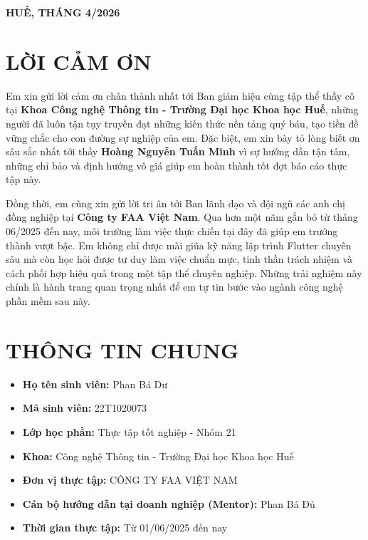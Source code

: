 \documentclass[12pt, a4paper]{article}
\begin{document}
\begin{titlepage}
    \vfill
    \begin{center}
        \textbf{HUẾ, THÁNG 4/2026}
    \end{center}
    \restoregeometry
\end{titlepage}

\newpage

\section*{LỜI CẢM ƠN}
Em xin gửi lời cảm ơn chân thành nhất tới Ban giám hiệu cùng tập thể thầy cô tại \textbf{Khoa Công nghệ Thông tin - Trường Đại học Khoa học Huế}, những người đã luôn tận tụy truyền đạt những kiến thức nền tảng quý báu, tạo tiền đề vững chắc cho con đường sự nghiệp của em. Đặc biệt, em xin bày tỏ lòng biết ơn sâu sắc nhất tới thầy \textbf{Hoàng Nguyễn Tuấn Minh} vì sự hướng dẫn tận tâm, những chỉ bảo và định hướng vô giá giúp em hoàn thành tốt đợt báo cáo thực tập này.

Đồng thời, em cũng xin gửi lời tri ân tới Ban lãnh đạo và đội ngũ các anh chị đồng nghiệp tại \textbf{Công ty FAA Việt Nam}. Qua hơn một năm gắn bó từ tháng 06/2025 đến nay, môi trường làm việc thực chiến tại đây đã giúp em trưởng thành vượt bậc. Em không chỉ được mài giũa kỹ năng lập trình Flutter chuyên sâu mà còn học hỏi được tư duy làm việc chuẩn mực, tinh thần trách nhiệm và cách phối hợp hiệu quả trong một tập thể chuyên nghiệp. Những trải nghiệm này chính là hành trang quan trọng nhất để em tự tin bước vào ngành công nghệ phần mềm sau này.

\newpage
\renewcommand{\contentsname}{MỤC LỤC}
\tableofcontents
\newpage


\section{THÔNG TIN CHUNG}
\begin{itemize}
    \item \textbf{Họ tên sinh viên:} Phan Bá Dư
    \item \textbf{Mã sinh viên:} 22T1020073
    \item \textbf{Lớp học phần:} Thực tập tốt nghiệp - Nhóm 21
    \item \textbf{Khoa:} Công nghệ Thông tin - Trường Đại học Khoa học Huế
    \item \textbf{Đơn vị thực tập:} CÔNG TY FAA VIỆT NAM
    \item \textbf{Cán bộ hướng dẫn tại doanh nghiệp (Mentor):} Phan Bá Đủ
    \item \textbf{Thời gian thực tập:} Từ 01/06/2025 đến nay
\end{itemize}
\end{document}
